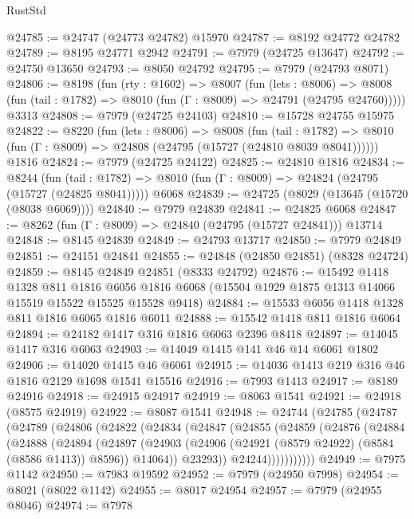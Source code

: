 \begin{lexlean}{RustStd}
\begin{coremodule}
@24785 := @24747 (@24773 @24782) @15970
@24787 := @8192 @24772 @24782
@24789 := @8195 @24771 @2942
@24791 := @7979 (@24725 @13647)
@24792 := @24750 @13650
@24793 := @8050 @24792
@24795 := @7979 (@24793 @8071)
@24806 := @8198
    (fun (rty : @1602) =>
    @8007
      (fun (lets : @8006) =>
      @8008 (fun (tail : @1782) => @8010 (fun (Γ : @8009) => @24791 (@24795 @24760)))))
    @3313
@24808 := @7979 (@24725 @24103)
@24810 := @15728 @24755 @15975
@24822 := @8220
    (fun (lets : @8006) =>
    @8008
      (fun (tail : @1782) =>
      @8010 (fun (Γ : @8009) => @24808 (@24795 (@15727 (@24810 @8039 @8041))))))
    @1816
@24824 := @7979 (@24725 @24122)
@24825 := @24810 @1816
@24834 := @8244
    (fun (tail : @1782) => @8010 (fun (Γ : @8009) => @24824 (@24795 (@15727 (@24825 @8041)))))
    @6068
@24839 := @24725 (@8029 (@13645 (@15720 (@8038 @6069))))
@24840 := @7979 @24839
@24841 := @24825 @6068
@24847 := @8262 (fun (Γ : @8009) => @24840 (@24795 (@15727 @24841))) @13714
@24848 := @8145 @24839
@24849 := @24793 @13717
@24850 := @7979 @24849
@24851 := @24151 @24841
@24855 := @24848 (@24850 @24851) (@8328 @24724)
@24859 := @8145 @24849 @24851 (@8333 @24792)
@24876 := @15492
    @1418
    @1328
    @811
    @1816
    @6056
    @1816
    @6068
    (@15504 @1929 @1875 @1313 @14066 @15519 @15522 @15525 @15528 @9418)
@24884 := @15533 @6056 @1418 @1328 @811 @1816 @6065 @1816 @6011
@24888 := @15542 @1418 @811 @1816 @6064
@24894 := @24182 @1417 @316 @1816 @6063 @2396 @8418
@24897 := @14045 @1417 @316 @6063
@24903 := @14049 @1415 @141 @46 @14 @6061 @1802
@24906 := @14020 @1415 @46 @6061
@24915 := @14036 @1413 @219 @316 @46 @1816 @2129 @1698 @1541 @15516
@24916 := @7993 @1413
@24917 := @8189 @24916
@24918 := @24915 @24917
@24919 := @8063 @1541
@24921 := @24918 (@8575 @24919)
@24922 := @8087 @1541
@24948 := @24744
    (@24785
      (@24787
        (@24789
          (@24806
            (@24822
              (@24834
                (@24847
                  (@24855
                    (@24859
                      (@24876
                        (@24884
                          (@24888
                            (@24894
                              (@24897
                                (@24903
                                  (@24906 (@24921 (@8579 @24922) (@8584 (@8586 @1413)) @8596))
                                  @14064))
                              @23293))
                          @24244)))))))))))
@24949 := @7975 @1142
@24950 := @7983 @19592
@24952 := @7979 (@24950 @7998)
@24954 := @8021 (@8022 @1142)
@24955 := @8017 @24954
@24957 := @7979 (@24955 @8046)
@24974 := @7978

\end{coremodule}
\end{lexlean}
